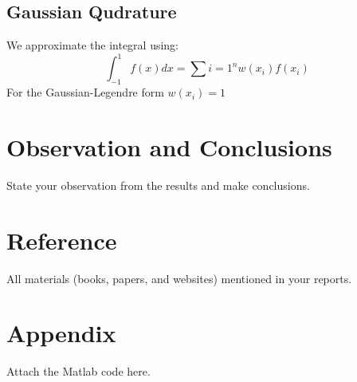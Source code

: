 \documentclass{ifacconf}
\begin{document}
\subsection{Gaussian Qudrature}
We approximate the integral using:
\begin{equation}
\int_{-1}^{1}f(x)dx = \sum{i=1}^{n} w(x_i)f(x_i)
\end{equation}
For the Gaussian-Legendre form $w(x_i)=1$



\section{Observation and Conclusions}
State your observation from the results and make conclusions. 

\section*{Reference}
All materials (books, papers, and websites) mentioned in your reports.   
\section*{Appendix}
Attach the Matlab code here.
\end{document}
